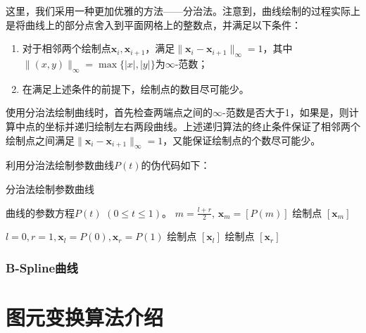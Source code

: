 \documentclass[a4paper,12pt]{article}
\begin{document}
这里，我们采用一种更加优雅的方法——分治法。注意到，曲线绘制的过程实际上是将曲线上的部分点舍入到平面网格上的整数点，并满足以下条件：

\begin{enumerate}
	\item 对于相邻两个绘制点$\bm{x}_i, \bm{x}_{i+1}$，满足$\|\bm{x}_i - \bm{x}_{i+1}\|_{\infty} = 1$，其中$\| (x, y) \|_{\infty} = \max\{|x|, |y|\}$为$\infty$-范数；
	\item 在满足上述条件的前提下，绘制点的数目尽可能少。
\end{enumerate}

使用分治法绘制曲线时，首先检查两端点之间的$\infty$-范数是否大于1，如果是，则计算中点的坐标并递归绘制左右两段曲线。上述递归算法的终止条件保证了相邻两个绘制点之间满足$\|\bm{x}_i - \bm{x}_{i+1}\|_{\infty} = 1$，又能保证绘制点的个数尽可能少。

利用分治法绘制参数曲线$P(t)$的伪代码如下：

\begin{algorithm}[htb] 
	\caption{分治法绘制参数曲线} 
	\label{alg:CurveDC} 
	\begin{algorithmic}[1] 
		\Require 曲线的参数方程$P(t)$ $(0 \leq t \leq 1)$。
		\State \Return
		\Else
		\State $m = \frac{l+r}{2}$, $\bm{x}_m = [P(m)]$
		\State {}
		\State 绘制点 $[\bm{x}_m]$
		\State {}
		\EndIf
		\EndFunction
		
		\State $l = 0, r = 1, \bm{x}_l = P(0), \bm{x}_r = P(1)$
		\State 绘制点 $[\bm{x}_l]$
		\State {}
		\State 绘制点 $[\bm{x}_r]$
	\end{algorithmic} 
\end{algorithm}

\subsubsection{B-Spline曲线}

\section{图元变换算法介绍}
\end{document}
